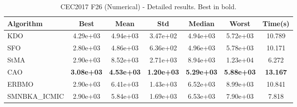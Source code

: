 \begin{table}[H]
\centering\small
\caption{CEC2017 F26 (Numerical) - Detailed results. Best in bold.}
\label{tab:cec2017_F26}
\begin{tabular}{lcccccc}
\toprule
\textbf{Algorithm} & \textbf{Best} & \textbf{Mean} & \textbf{Std} & \textbf{Median} & \textbf{Worst} & \textbf{Time(s)} \\
\midrule
KDO & 4.29e+03 & 4.94e+03 & 3.47e+02 & 4.94e+03 & 5.72e+03 & 10.789 \\
SFO & 2.80e+03 & 4.86e+03 & 6.36e+02 & 4.96e+03 & 5.78e+03 & 10.171 \\
StMA & 2.90e+03 & 8.52e+03 & 2.71e+03 & 8.94e+03 & 1.23e+04 & 6.272 \\
CAO & \textbf{3.08e+03} & \textbf{4.53e+03} & \textbf{1.20e+03} & \textbf{5.29e+03} & \textbf{5.88e+03} & \textbf{13.167} \\
ERBMO & 2.90e+03 & 6.41e+03 & 1.43e+03 & 6.52e+03 & 8.99e+03 & 10.841 \\
SMNBKA_ICMIC & 2.90e+03 & 5.84e+03 & 1.69e+03 & 6.53e+03 & 7.90e+03 & 7.818 \\
\bottomrule
\end{tabular}
\end{table}
